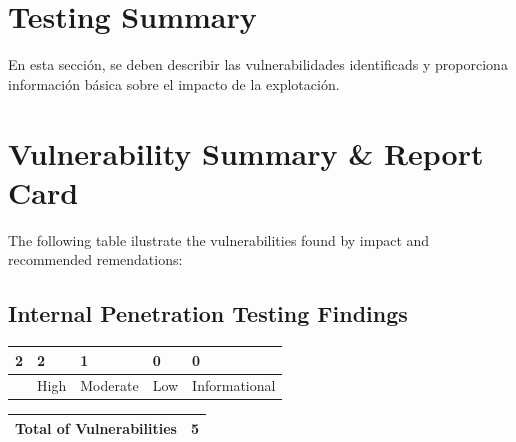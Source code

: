 \documentclass[a4paper]{article} %
\begin{document}
    \section{Testing Summary}
    En esta sección, se deben describir las vulnerabilidades identificads y proporciona información básica sobre el impacto de la explotación.

    \clearpage
    \section{Vulnerability Summary \& Report Card}
    The following table ilustrate the vulnerabilities found by impact and recommended remendations:

    \subsection{Internal Penetration Testing Findings}

    \begin{table}[htbp]
        \begin{tabularx}{\textwidth}{|>{\centering\arraybackslash}X|>{\centering\arraybackslash}X|>{\centering\arraybackslash}X|>{\centering\arraybackslash}X|>{\centering\arraybackslash}X|}
            \hline
            \cellcolor{criticalColor}\textbf{2} &
            \cellcolor{highColor}\textbf{2} &
            \cellcolor{moderateColor}\textbf{1} &
            \cellcolor{lowColor}\textbf{0} &
            \cellcolor{informationalColor}\textbf{0} \\
            \hline
            {Critical} &
            {High} &
            {Moderate} &
            {Low} &
            {Informational} \\
            \hline
        \end{tabularx}
    \end{table}

    \begin{table}[htbp]
        \begin{tabularx}{\textwidth}{|X|>{\centering\arraybackslash}X|}
            \hline
            \cellcolor{lightBlueColor}\textbf{Total of Vulnerabilities} &
            {5} \\
            \hline
        \end{tabularx}
    \end{table}
\end{document}
